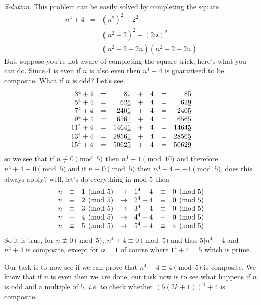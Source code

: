 \documentclass[aps,preprint,preprintnumbers,nofootinbib,showpacs,prd]{revtex4-1}
\newcommand{\ie}{{\it i.e.} }
\newcommand{\nbea}{\begin{eqnarray*}}
\newcommand{\neea}{\end{eqnarray*}}
\begin{document}
{\it Solution}. This problem can be easily solved by completing the square
%
\nbea
n^4 + 4 & = & (n^2)^2 + 2^2 \\
& = & (n^2 + 2)^2 - (2n)^2 \\
& = & (n^2 + 2 - 2n)(n^2 + 2 + 2n)
\neea
%
But, suppose you're not aware of completing the square trick, here's what you can do. Since $4$ is even if $n$ is also even then $n^4 + 4$ is guaranteed to be composite. What if $n$ is odd? Let's see
%
\nbea
\begin{array}{r c r c r c r}
3^4 + 4 & = & 8\underline{1} &+& 4 &=& 8\underline{5} \\
5^4 + 4 & = & 62\underline{5} &+& 4 &=& 62\underline{9} \\
7^4 + 4 & = & 240\underline{1} &+& 4 &=& 240\underline{5} \\
9^4 + 4 & = & 656\underline{1} &+& 4 &=& 656\underline{5} \\
11^4 + 4 & = & 1464\underline{1} &+& 4 &=& 1464\underline{5} \\
13^4 + 4 & = & 2856\underline{1} &+& 4 &=& 2856\underline{5} \\
15^4 + 4 & = & 5062\underline{5} &+& 4 &=& 5062\underline{9}
\end{array}
\neea
%
so we see that if $n \not\equiv 0 \pmod{5}$ then $n^4 \equiv 1 \pmod{10}$ and therefore $n^4 + 4 \equiv 0 \pmod{5}$ and if $n \equiv 0 \pmod{5}$ then $n^4 + 4 \equiv -1 \pmod{5}$, does this always apply? well, let's do everything in mod 5 then
%
\nbea
\begin{array}{r c l c r c l}
n & \equiv & 1\pmod{5} & \to & 1^4 + 4 & \equiv & 0 \pmod {5} \\
n & \equiv & 2\pmod{5} & \to & 2^4 + 4 & \equiv & 0 \pmod {5} \\
n & \equiv & 3\pmod{5} & \to & 3^4 + 4 & \equiv & 0 \pmod {5} \\
n & \equiv & 4\pmod{5} & \to & 4^4 + 4 & \equiv & 0 \pmod {5} \\
n & \equiv & 5\pmod{5} & \to & 5^4 + 4 & \equiv & 4 \pmod {5}
\end{array}
\neea
%
So it is true, for $n \not\equiv 0 \pmod{5}$, $n^4 + 4 \equiv 0 \pmod{5}$ and thus $5|n^4 + 4$ and $n^4 + 4$ is composite, except for $n=1$ of course where $1^4 + 4 = 5$ which is prime.

Our task is to now see if we can prove that $n^4 + 4 \equiv 4 \pmod{5}$ is composite. We know that if $n$ is even then we are done, our task now is to see what happens if $n$ is odd and a multiple of $5$, \ie to check whether $(5(2k+1))^4 + 4$ is composite.
\end{document}
